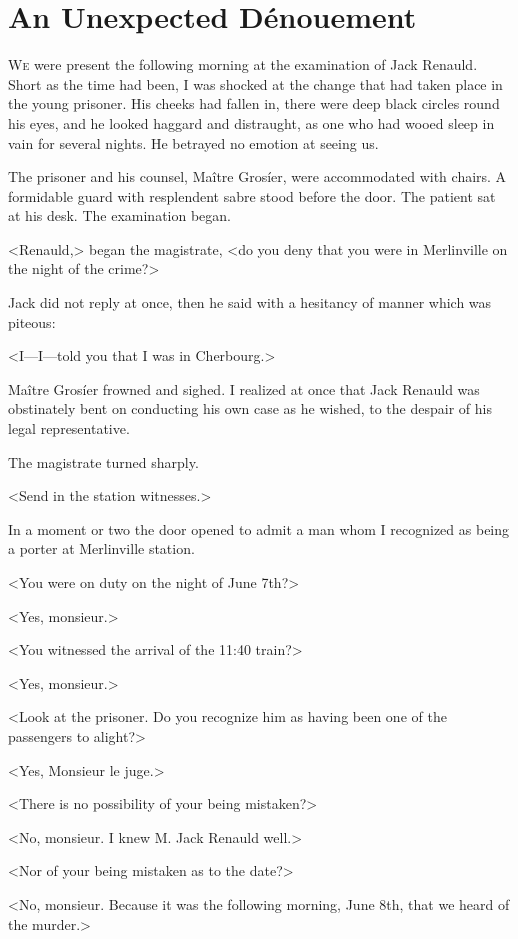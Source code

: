 \chapter{An Unexpected Dénouement}

\lettrine{W}{e} were present the following morning at the examination of Jack Renauld. Short as the time had been, I was shocked at the change that had taken place in the young prisoner. His cheeks had fallen in, there were deep black circles round his eyes, and he looked haggard and distraught, as one who had wooed sleep in vain for several nights. He betrayed no emotion at seeing us. 

 The prisoner and his counsel, Maître Grosíer, were accommodated with chairs. A formidable guard with resplendent sabre stood before the door. The patient  sat at his desk. The examination began. 

 <Renauld,> began the magistrate, <do you deny that you were in Merlinville on the night of the crime?> 

 Jack did not reply at once, then he said with a hesitancy of manner which was piteous: 

 <I—I—told you that I was in Cherbourg.> 

 Maître Grosíer frowned and sighed. I realized at once that Jack Renauld was obstinately bent on conducting his own case as he wished, to the despair of his legal representative. 

 The magistrate turned sharply. 

 <Send in the station witnesses.> 

 In a moment or two the door opened to admit a man whom I recognized as being a porter at Merlinville station. 

 <You were on duty on the night of June 7th?> 

 <Yes, monsieur.> 

 <You witnessed the arrival of the 11:40 train?> 

 <Yes, monsieur.> 

 <Look at the prisoner. Do you recognize him as having been one of the passengers to alight?> 

 <Yes, Monsieur le juge.> 

 <There is no possibility of your being mistaken?> 

 <No, monsieur. I knew M. Jack Renauld well.> 

 <Nor of your being mistaken as to the date?> 

 <No, monsieur. Because it was the following morning, June 8th, that we heard of the murder.> 

